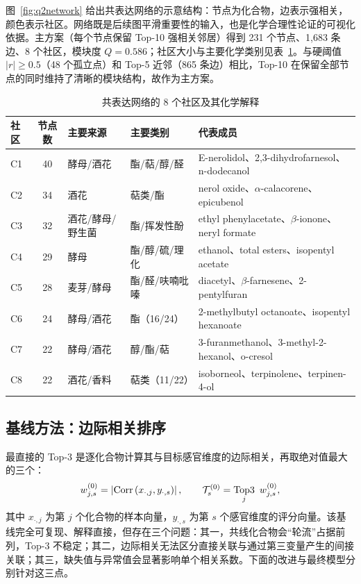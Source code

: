 
图~\ref{fig:q2network} 给出共表达网络的示意结构：节点为化合物，边表示强相关，颜色表示社区。网络既是后续图平滑重要性的输入，也是化学合理性论证的可视化依据。主方案（每个节点保留 Top-10 强相关邻居）得到 231 个节点、1,683 条边、8 个社区，模块度 $Q=0.586$；社区大小与主要化学类别见表~\ref{tab:q2-communities}。与硬阈值 $|r|\ge0.5$（48 个孤立点）和 Top-5 近邻（865 条边）相比，Top-10 在保留全部节点的同时维持了清晰的模块结构，故作为主方案。

\begin{table}[htbp]
  \centering
  \caption{共表达网络的 8 个社区及其化学解释}
  \label{tab:q2-communities}
  \small
  \begin{tabularx}{\textwidth}{@{}l c l l X@{}}
    \toprule
    社区 & 节点数 & 主要来源 & 主要类别 & 代表成员 \\
    \midrule
    C1 & 40 & 酵母/酒花 & 酯/萜/醇/醛 & E-nerolidol、2,3-dihydrofarnesol、n-dodecanol \\
    C2 & 34 & 酒花 & 萜类/酯 & nerol oxide、$\alpha$-calacorene、epicubenol \\
    C3 & 32 & 酒花/酵母/野生菌 & 酯/挥发性酚 & ethyl phenylacetate、$\beta$-ionone、neryl formate \\
    C4 & 29 & 酵母 & 酯/醇/硫/理化 & ethanol、total esters、isopentyl acetate \\
    C5 & 28 & 麦芽/酵母 & 酯/醛/呋喃吡嗪 & diacetyl、$\beta$-farnesene、2-pentylfuran \\
    C6 & 24 & 酵母/酒花 & 酯（16/24） & 2-methylbutyl octanoate、isopentyl hexanoate \\
    C7 & 22 & 酵母/酒花 & 醇/酯/萜 & 3-furanmethanol、3-methyl-2-hexanol、o-cresol \\
    C8 & 22 & 酒花/香料 & 萜类（11/22） & isoborneol、terpinolene、terpinen-4-ol \\
    \bottomrule
  \end{tabularx}
\end{table}

\subsection{基线方法：边际相关排序}

最直接的 Top-3 是逐化合物计算其与目标感官维度的边际相关，再取绝对值最大的三个：
\begin{equation}
  w_{j,s}^{(0)}=\left\lvert \operatorname{Corr}\left(x_{\cdot,j},y_{\cdot,s}\right) \right\rvert,
  \qquad
  \mathcal{T}_s^{(0)}=\operatorname*{Top3}_{j}\ w_{j,s}^{(0)},
  \label{eq:q2-baseline}
\end{equation}
其中 $x_{\cdot,j}$ 为第 $j$ 个化合物的样本向量，$y_{\cdot,s}$ 为第 $s$ 个感官维度的评分向量。该基线完全可复现、解释直接，但存在三个问题：其一，共线化合物会“轮流”占据前列，Top-3 不稳定；其二，边际相关无法区分直接关联与通过第三变量产生的间接关联；其三，缺失值与异常值会显著影响单个相关系数。下面的改进与最终模型分别针对这三点。

